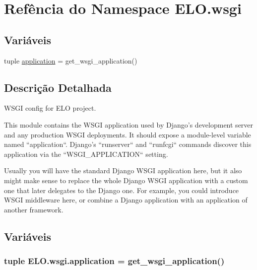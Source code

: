 \hypertarget{namespaceELO_1_1wsgi}{\section{Refência do Namespace E\-L\-O.\-wsgi}
\label{namespaceELO_1_1wsgi}
}
\subsection*{Variáveis}
\begin{DoxyCompactItemize}
\item 
tuple \hyperlink{namespaceELO_1_1wsgi_a8951c4ea2920440aeeb73c65ab517a5d}{application} = get\-\_\-wsgi\-\_\-application()
\end{DoxyCompactItemize}


\subsection{Descrição Detalhada}
\begin{DoxyVerb}WSGI config for ELO project.

This module contains the WSGI application used by Django's development server
and any production WSGI deployments. It should expose a module-level variable
named ``application``. Django's ``runserver`` and ``runfcgi`` commands discover
this application via the ``WSGI_APPLICATION`` setting.

Usually you will have the standard Django WSGI application here, but it also
might make sense to replace the whole Django WSGI application with a custom one
that later delegates to the Django one. For example, you could introduce WSGI
middleware here, or combine a Django application with an application of another
framework.\end{DoxyVerb}
 

\subsection{Variáveis}
\hypertarget{namespaceELO_1_1wsgi_a8951c4ea2920440aeeb73c65ab517a5d}{
\subsubsection[{application}]{\setlength{\rightskip}{0pt plus 5cm}tuple E\-L\-O.\-wsgi.\-application = get\-\_\-wsgi\-\_\-application()}}\label{namespaceELO_1_1wsgi_a8951c4ea2920440aeeb73c65ab517a5d}
